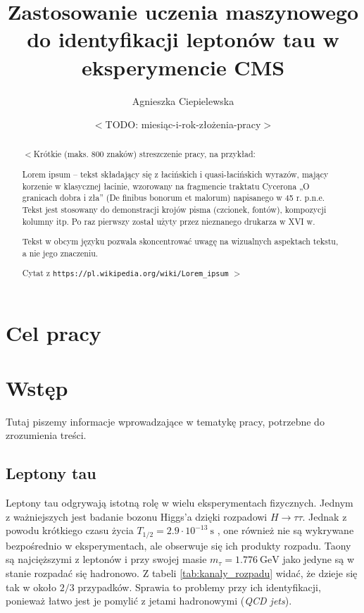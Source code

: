 \documentclass{pracalicmgr}
\author{Agnieszka Ciepielewska}
\title{Zastosowanie uczenia maszynowego do identyfikacji leptonów tau w eksperymencie CMS}
\date{$<$TODO: miesiąc-i-rok-złożenia-pracy$>$}
\begin{document}
    \maketitle
    \let\cleardoublepage\clearpage
    
    \begin{abstract}
$<$Krótkie (maks. 800 znaków) streszczenie pracy, na przykład:

Lorem ipsum – tekst składający się z łacińskich i quasi-łacińskich wyrazów, mający korzenie w klasycznej łacinie, wzorowany na fragmencie traktatu Cycerona „O granicach dobra i zła” (De finibus bonorum et malorum) napisanego w 45 r. p.n.e. Tekst jest stosowany do demonstracji krojów pisma (czcionek, fontów), kompozycji kolumny itp. Po raz pierwszy został użyty przez nieznanego drukarza w XVI w.

Tekst w obcym języku pozwala skoncentrować uwagę na wizualnych aspektach tekstu, a nie jego znaczeniu.

Cytat z {\tt https://pl.wikipedia.org/wiki/Lorem\_ipsum}
$>$

    \end{abstract}

    \tableofcontents
    
    \chapter*{Cel pracy}
    \chapter{Wstęp}
    Tutaj piszemy informacje wprowadzające w tematykę  pracy, potrzebne do zrozumienia treści.       
    \section{Leptony tau}
    
    Leptony tau	odgrywają istotną rolę w wielu eksperymentach fizycznych. Jednym z ważniejszych jest badanie bozonu Higgs'a dzięki rozpadowi $H \rightarrow \tau\tau$. Jednak z powodu krótkiego czasu życia $T_{1/2} = 2.9 \cdot 10^{-13}~\mathrm{s}$ \cite{particle_physics}, one również nie są wykrywane bezpośrednio w eksperymentach, ale obserwuje się ich produkty rozpadu. Taony są najcięższymi z leptonów i przy swojej masie $m_\tau = 1.776 ~\mathrm{GeV}$ \cite{particle_physics} jako jedyne są w stanie rozpadać się hadronowo. Z tabeli \ref{tab:kanaly_rozpadu} widać, że dzieje się tak w około $2/3$ przypadków. Sprawia to problemy przy ich identyfikacji, ponieważ łatwo jest je pomylić z jetami hadronowymi (\textit{QCD jets}).
    
\end{document}
